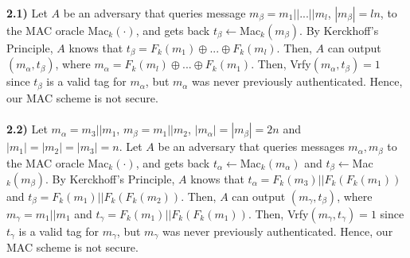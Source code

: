 \documentclass[12pt]{article}
\begin{document}
\noindent \textbf{2.1)} Let $A$ be an adversary that queries message $m_\beta = m_1||...||m_l$, $|m_\beta| = ln$, to the MAC oracle Mac$_k(\cdot)$, and gets back $t_\beta \leftarrow $Mac$_k(m_\beta)$. By Kerckhoff's Principle, $A$ knows that $t_\beta = F_k(m_1) \oplus ... \oplus F_k(m_l)$. Then, $A$ can output $(m_\alpha, t_\beta)$, where $m_\alpha = F_k(m_l) \oplus ... \oplus F_k(m_1)$. Then, Vrfy$(m_\alpha, t_\beta) = 1$ since $t_\beta$ is a valid tag for $m_\alpha$, but $m_\alpha$ was never previously authenticated. Hence, our MAC scheme is not secure.
\\
\\
\noindent \textbf{2.2)} Let $m_\alpha = m_3||m_1$, $m_\beta = m_1||m_2$, $|m_\alpha| = |m_\beta| = 2n$ and $|m_1|=|m_2|=|m_3|=n$. Let $A$ be an adversary that queries messages $m_\alpha, m_\beta$ to the MAC oracle Mac$_k(\cdot)$, and gets back $t_\alpha \leftarrow $Mac$_k(m_\alpha)$ and $t_\beta \leftarrow $Mac$_k(m_\beta)$. By Kerckhoff's Principle, $A$ knows that $t_\alpha = F_k(m_3)||F_k(F_k(m_1))$ and $t_\beta = F_k(m_1)||F_k(F_k(m_2))$. Then, $A$ can output $(m_\gamma, t_\beta)$, where $m_\gamma = m_1||m_1$ and $t_\gamma = F_k(m_1)||F_k(F_k(m_1))$. Then, Vrfy$(m_\gamma, t_\gamma) = 1$ since $t_\gamma$ is a valid tag for $m_\gamma$, but $m_\gamma$ was never previously authenticated. Hence, our MAC scheme is not secure.
\end{document}
